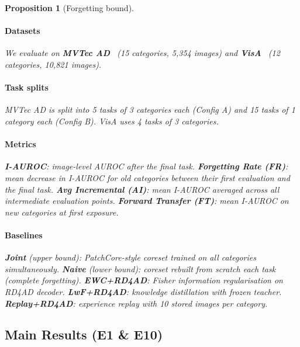 \documentclass[conference]{IEEEtran}
\newtheorem{proposition}{Proposition}
\begin{document}
\begin{proposition}[Forgetting bound]
\paragraph{Datasets} We evaluate on \textbf{MVTec AD}~\cite{bergmann2019mvtec} (15 categories, 5{,}354 images) and \textbf{VisA}~\cite{zou2022visa} (12 categories, 10{,}821 images).

\paragraph{Task splits} MVTec AD is split into 5 tasks of 3 categories each (Config A) and 15 tasks of 1 category each (Config B). VisA uses 4 tasks of 3 categories.

\paragraph{Metrics} \textbf{I-AUROC}: image-level AUROC after the final task. \textbf{Forgetting Rate (FR)}: mean decrease in I-AUROC for old categories between their first evaluation and the final task. \textbf{Avg Incremental (AI)}: mean I-AUROC averaged across all intermediate evaluation points. \textbf{Forward Transfer (FT)}: mean I-AUROC on new categories at first exposure.

\paragraph{Baselines} \textbf{Joint} (upper bound): PatchCore-style coreset trained on all categories simultaneously. \textbf{Naive} (lower bound): coreset rebuilt from scratch each task (complete forgetting). \textbf{EWC+RD4AD}: Fisher information regularisation on RD4AD decoder. \textbf{LwF+RD4AD}: knowledge distillation with frozen teacher. \textbf{Replay+RD4AD}: experience replay with 10 stored images per category.

\subsection{Main Results (E1 \& E10)}


\end{proposition}
\end{document}
